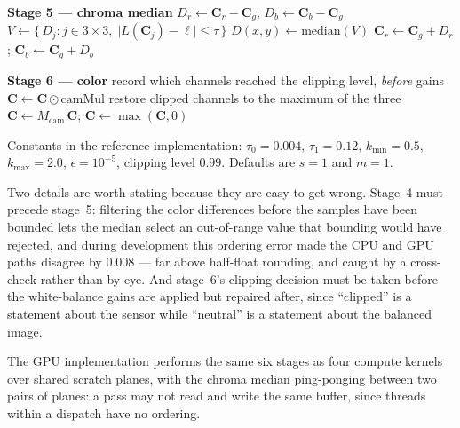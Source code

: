 \documentclass[10pt,a4paper]{article}
\begin{document}
\begin{algorithmic}[1]
\Statex
\Statex \textbf{Stage 5 --- chroma median}
\State $D_r \gets \mathbf{C}_r - \mathbf{C}_g$;\quad
       $D_b \gets \mathbf{C}_b - \mathbf{C}_g$
    \State $V \gets \{\,D_j : j \in 3\times3,\;
           \lvert L(\mathbf{C}_j) - \ell \rvert \le \tau \,\}$
     \State $D(x,y) \gets \mathrm{median}(V)$ \EndIf
  \EndFor
\EndFor
\State $\mathbf{C}_r \gets \mathbf{C}_g + D_r$;\quad
       $\mathbf{C}_b \gets \mathbf{C}_g + D_b$

\Statex
\Statex \textbf{Stage 6 --- color}
\State record which channels reached the clipping level, \emph{before} gains
\State $\mathbf{C} \gets \mathbf{C} \odot \text{camMul}$
\State restore clipped channels to the maximum of the three
\State $\mathbf{C} \gets M_{\text{cam}}\,\mathbf{C}$;\quad
       $\mathbf{C} \gets \max(\mathbf{C}, 0)$
\end{algorithmic}

\medskip
Constants in the reference implementation: $\tau_0 = 0.004$, $\tau_1 = 0.12$,
$k_{\min} = 0.5$, $k_{\max} = 2.0$, $\epsilon = 10^{-5}$, clipping level
$0.99$. Defaults are $s = 1$ and $m = 1$.

Two details are worth stating because they are easy to get wrong. Stage~4 must
precede stage~5: filtering the color differences before the samples have been
bounded lets the median select an out-of-range value that bounding would have
rejected, and during development this ordering error made the CPU and GPU paths
disagree by $0.008$ --- far above half-float rounding, and caught by a
cross-check rather than by eye. And stage~6's clipping decision must be taken
before the white-balance gains are applied but repaired after, since ``clipped''
is a statement about the sensor while ``neutral'' is a statement about the
balanced image.

The GPU implementation performs the same six stages as four compute kernels
over shared scratch planes, with the chroma median ping-ponging between two
pairs of planes: a pass may not read and write the same buffer, since threads
within a dispatch have no ordering.
\end{document}
